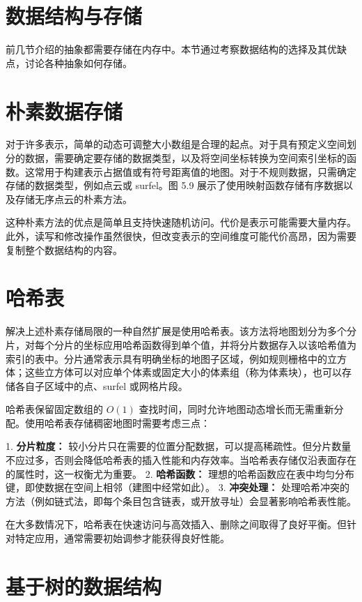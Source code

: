 \section{数据结构与存储}

前几节介绍的抽象都需要存储在内存中。本节通过考察数据结构的选择及其优缺点，讨论各种抽象如何存储。

\section{朴素数据存储}

对于许多表示，简单的动态可调整大小数组是合理的起点。对于具有预定义空间划分的数据，需要确定要存储的数据类型，以及将空间坐标转换为空间索引坐标的函数。这常用于构建表示占据值或有符号距离值的地图。对于不规则数据，只需确定存储的数据类型，例如点云或 surfel。图 5.9 展示了使用映射函数存储有序数据以及存储无序点云的朴素方法。

这种朴素方法的优点是简单且支持快速随机访问。代价是表示可能需要大量内存。此外，读写和修改操作虽然很快，但改变表示的空间维度可能代价高昂，因为需要复制整个数据结构的内容。

\section{哈希表}

解决上述朴素存储局限的一种自然扩展是使用哈希表。该方法将地图划分为多个分片，对每个分片的坐标应用哈希函数得到单个值，并将分片数据存入以该哈希值为索引的表中。分片通常表示具有明确坐标的地图子区域，例如规则栅格中的立方体；这些立方体可以对应单个体素或固定大小的体素组（称为体素块），也可以存储各自子区域中的点、surfel 或网格片段。

哈希表保留固定数组的 $O(1)$ 查找时间，同时允许地图动态增长而无需重新分配。使用哈希表存储稠密地图时需要考虑三点：

1. \textbf{分片粒度：} 较小分片只在需要的位置分配数据，可以提高稀疏性。但分片数量不应过多，否则会降低哈希表的插入性能和内存效率。当哈希表存储仅沿表面存在的属性时，这一权衡尤为重要。
2. \textbf{哈希函数：} 理想的哈希函数应在表中均匀分布键，即使数据在空间上相邻（建图中经常如此）。
3. \textbf{冲突处理：} 处理哈希冲突的方法（例如链式法，即每个条目包含链表，或开放寻址）会显著影响哈希表性能。

在大多数情况下，哈希表在快速访问与高效插入、删除之间取得了良好平衡。但针对特定应用，通常需要初始调参才能获得良好性能。

\section{基于树的数据结构}

